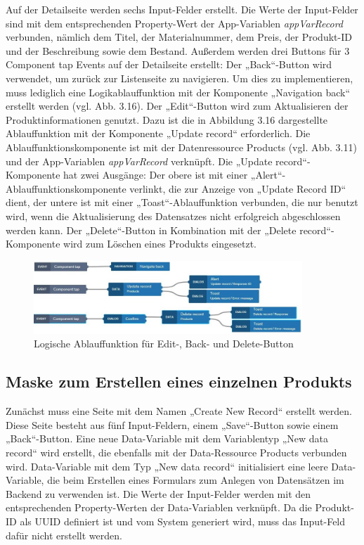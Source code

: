 Auf der Detailseite werden sechs Input-Felder erstellt. Die Werte der Input-Felder sind mit dem entsprechenden Property-Wert der App-Variablen \textit{appVarRecord} verbunden, nämlich dem Titel, der Materialnummer, dem Preis, der Produkt-ID und der Beschreibung sowie dem Bestand. Außerdem werden drei Buttons für 3 Component tap Events auf der Detailseite erstellt: Der „Back“-Button wird verwendet, um zurück zur Listenseite zu navigieren. Um dies zu implementieren, muss lediglich eine Logikablauffunktion mit der Komponente „Navigation back“ erstellt werden (vgl. Abb. 3.16). Der „Edit“-Button wird zum Aktualisieren der Produktinformationen genutzt. Dazu ist die in Abbildung 3.16 dargestellte Ablauffunktion mit der Komponente „Update record“ erforderlich. Die Ablauffunktionskomponente ist mit der Datenressource Products (vgl. Abb. 3.11) und der App-Variablen \textit{appVarRecord} verknüpft. Die „Update record“-Komponente hat zwei Ausgänge: Der obere ist mit einer „Alert“-Ablauffunktionskomponente verlinkt, die zur Anzeige von „Update Record ID“ dient, der untere ist mit einer „Toast“-Ablauffunktion verbunden, die nur benutzt wird, wenn die Aktualisierung des Datensatzes nicht erfolgreich abgeschlossen werden kann. Der „Delete“-Button in Kombination mit der „Delete record“-Komponente wird zum Löschen eines Produkts eingesetzt.

\begin{figure}[htbp]
 \centering
 \includegraphics[width=0.9\textwidth]{Bilder/appgyver/3_16_button_logic.jpg}
 \caption{Logische Ablauffunktion für Edit-, Back- und Delete-Button}
\end{figure}

\subsection{Maske zum Erstellen eines einzelnen Produkts}
Zunächst muss eine Seite mit dem Namen „Create New Record“ erstellt werden. Diese Seite besteht aus fünf Input-Feldern, einem „Save“-Button sowie einem „Back“-Button. Eine neue Data-Variable mit dem Variablentyp „New data record“ wird erstellt, die ebenfalls mit der Data-Ressource Products verbunden wird. Data-Variable mit dem Typ „New data record“ initialisiert eine leere Data-Variable, die beim Erstellen eines Formulars zum Anlegen von Datensätzen im Backend zu verwenden ist. Die Werte der Input-Felder werden mit den entsprechenden Property-Werten der Data-Variablen verknüpft. Da die Produkt-ID als UUID definiert ist und vom System generiert wird, muss das Input-Feld dafür nicht erstellt werden.

